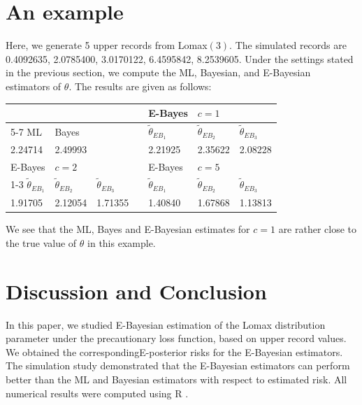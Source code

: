 \documentclass[twoside]{article}
\begin{document}
\section{An example}
Here, we generate 5 upper records from Lomax$(3)$. The simulated records are 0.4092635, 2.0785400, 3.0170122, 6.4595842, 8.2539605. Under the settings stated in the previous section, we compute the ML, Bayesian, and E-Bayesian estimators of $\theta$. The results are given as follows:
\begin{center}
\small
\begin{tabular}{lllllll}
  \hline
  &&&& E-Bayes & $c=1$&\\
  \cline{5-7}
  ML  & Bayes &&& $\widetilde{\theta}_{EB_1}$ & $\widetilde{\theta}_{EB_2}$ & $\widetilde{\theta}_{EB_3}$    \\  \hline  
2.24714&2.49993&&&2.21925&2.35622&2.08228\\
\hline \hline
  E-Bayes & $c=2$&&& E-Bayes & $c=5$&\\
  \cline{1-3}\cline{5-7}
$\widetilde{\theta}_{EB_1}$ & $\widetilde{\theta}_{EB_2}$ & $\widetilde{\theta}_{EB_3}$ &&$\widetilde{\theta}_{EB_1}$ & $\widetilde{\theta}_{EB_2}$ & $\widetilde{\theta}_{EB_3}$ \\  
 \hline
 1.91705&2.12054&1.71355&&1.40840&1.67868&1.13813
\\ \hline
\end{tabular}
\end{center}
We see that the ML, Bayes and E-Bayesian estimates for $c=1$ are rather close to the true value of $\theta$ in this example.
\section*{Discussion and Conclusion}   
In this paper, we studied E-Bayesian estimation of the Lomax distribution parameter under the precautionary loss function, based on upper record values. We obtained the corresponding\linebreak E-posterior risks for the E-Bayesian estimators. The simulation study demonstrated that the \linebreak E-Bayesian estimators can perform better than the ML and Bayesian estimators with respect to estimated risk. All numerical results were computed using R \citep{R:Core:Team:2026}.
\end{document}
